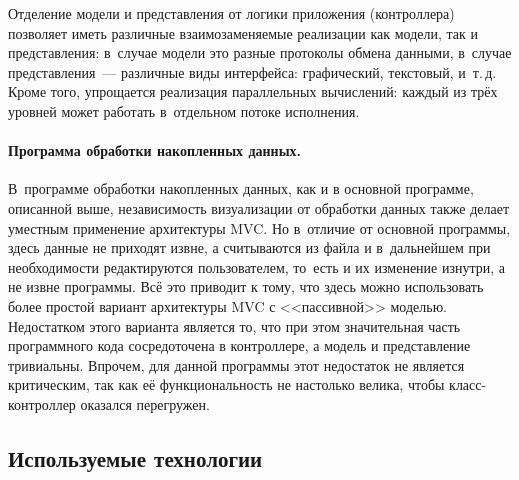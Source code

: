 \documentclass[a4paper, 14pt]{extarticle}
\newcommand{\eng}[1]{{\English #1}}
\begin{document}
  Отделение модели и представления от логики приложения (контроллера) позволяет иметь различные
  взаимозаменяемые реализации как модели, так и представления: в~случае модели это разные протоколы
  обмена данными, в~случае представления~--- различные виды интерфейса: графический, текстовый, и~т.\,д.
  Кроме того, упрощается реализация параллельных вычислений: каждый из трёх уровней может работать
  в~отдельном потоке исполнения.

  \paragraph{Программа обработки накопленных данных.}
  В~программе обработки накопленных данных, как и в основной программе, описанной выше,
  независимость визуализации от обработки данных также делает уместным
  применение архитектуры MVC. Но в~отличие от основной программы, здесь данные не приходят извне, а
  считываются из файла и в~дальнейшем при необходимости редактируются пользователем, то~есть и их
  изменение изнутри, а не извне программы. Всё это приводит к тому, что здесь можно использовать
  более простой вариант архитектуры MVC с <<пассивной>> моделью. Недостатком этого варианта является
  то, что при этом значительная часть программного кода сосредоточена в контроллере, а модель и
  представление тривиальны. Впрочем, для данной программы этот недостаток не является критическим,
  так как её функциональность не настолько велика, чтобы класс-контроллер оказался перегружен.

  \subsection{Используемые технологии}\label{ssec:techno}

\end{document}
